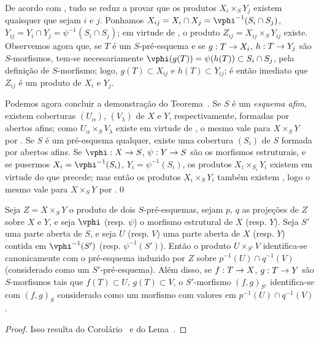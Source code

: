 \documentclass[oneside]{amsart}
\makeatletter
\newcommand{\ega@arrow}[2]{\mathchoice{#1}{#2}{#2}{#2}}
\renewcommand{\to}{\ega@arrow{\longrightarrow}{\rightarrow}}
\newcommand{\oldpage}[2][]{{\marginnote{\normalfont\textbf{#1}~|~#2}}\ignorespaces}
\let\EGAOriginalLabel\label
\renewcommand{\label}[1]{\phantomsection\EGAOriginalLabel{#1}}
\makeatother
\begin{document}
De acordo com , tudo se reduz a provar que os produtos
$X_i\times_S Y_j$ existem quaisquer que sejam $i$ e $j$. Ponhamos
$X_{ij}=X_i\cap X_j=\vphi^{-1}(S_i\cap S_j)$,
$Y_{ij}=Y_i\cap Y_j=\psi^{-1}(S_i\cap S_j)$; em virtude de
, o produto $Z_{ij}=X_{ij}\times_S Y_{ij}$ existe.
Observemos agora que, se $T$ é um $S$-pré-esquema e se $g:T\to X_i$,
$h:T\to Y_j$ são $S$-morfismos, tem-se necessariamente
$\vphi(g(T))=\psi(h(T))\subset S_i\cap S_j$, pela definição de
$S$-morfismo; logo, $g(T)\subset X_{ij}$ e $h(T)\subset Y_{ij}$; é então
imediato que $Z_{ij}$ é um produto de $X_i$ e $Y_j$.

\begin{env}[3.2.6.5]
\label{I.3.2.6.5}
Podemos agora concluir a demonstração do Teorema~. Se $S$
é um \emph{esquema afim}, existem coberturas $(U_\alpha)$, $(V_\lambda)$
de $X$ e $Y$, respectivamente, formadas por abertos afins; como
$U_\alpha\times_S V_\lambda$ existe em virtude de , o mesmo
vale para $X\times_S Y$ por . Se $S$ é um pré-esquema
qualquer, existe uma cobertura $(S_i)$ de $S$ formada por abertos afins. Se
$\vphi:X\to S$, $\psi:Y\to S$ são os morfismos estruturais, e se pusermos
$X_i=\vphi^{-1}(S_i)$, $Y_i=\psi^{-1}(S_i)$, os produtos
$X_i\times_{S_i}Y_i$ existem em virtude do que
\oldpage[I]{108}
precede; mas então os produtos $X_i\times_S Y_i$ também existem
, logo o mesmo vale para $X\times_S Y$ por
.\qed
\end{env}

\begin{corollary}[3.2.7]
\label{I.3.2.7}
Seja $Z=X\times_S Y$ o produto de dois $S$-pré-esquemas, sejam $p$, $q$ as
projeções de $Z$ sobre $X$ e $Y$, e seja $\vphi$ (resp. $\psi$) o morfismo
estrutural de $X$ (resp. $Y$). Seja $S'$ uma parte aberta de $S$, e seja
$U$ (resp. $V$) uma parte aberta de $X$ (resp. $Y$) contida em
$\vphi^{-1}(S')$ (resp. $\psi^{-1}(S')$). Então o produto
$U\times_{S'}V$ identifica-se canonicamente com o pré-esquema induzido por
$Z$ sobre $p^{-1}(U)\cap q^{-1}(V)$ (considerado como um
$S'$-pré-esquema). Além disso, se $f:T\to X$, $g:T\to Y$ são
$S$-morfismos tais que $f(T)\subset U$, $g(T)\subset V$, o $S'$-morfismo
$(f,g)_{S'}$ identifica-se com $(f,g)_S$ considerado como um morfismo com
valores em $p^{-1}(U)\cap q^{-1}(V)$.
\end{corollary}

\begin{proof}
Isso resulta do Corolário~ e do Lema~.
\end{proof}
\end{document}
